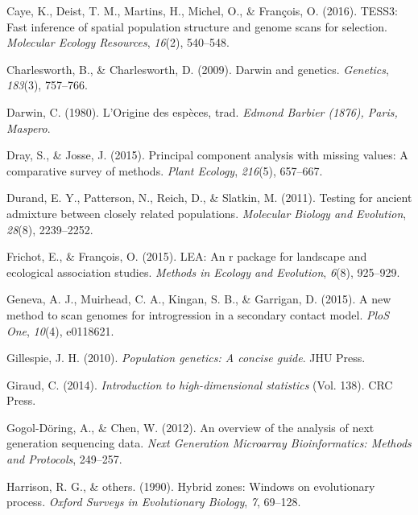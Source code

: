 \documentclass[12pt,twoside]{ugathesis}
\begin{document}
  \hypertarget{ref-caye2016tess3}{}
  Caye, K., Deist, T. M., Martins, H., Michel, O., \& François, O. (2016).
  TESS3: Fast inference of spatial population structure and genome scans
  for selection. \emph{Molecular Ecology Resources}, \emph{16}(2),
  540--548.
  
  \hypertarget{ref-charlesworth2009darwin}{}
  Charlesworth, B., \& Charlesworth, D. (2009). Darwin and genetics.
  \emph{Genetics}, \emph{183}(3), 757--766.
  
  \hypertarget{ref-darwin1980origine}{}
  Darwin, C. (1980). L'Origine des espèces, trad. \emph{Edmond Barbier
  (1876), Paris, Maspero}.
  
  \hypertarget{ref-dray2015principal}{}
  Dray, S., \& Josse, J. (2015). Principal component analysis with missing
  values: A comparative survey of methods. \emph{Plant Ecology},
  \emph{216}(5), 657--667.
  
  \hypertarget{ref-durand2011testing}{}
  Durand, E. Y., Patterson, N., Reich, D., \& Slatkin, M. (2011). Testing
  for ancient admixture between closely related populations.
  \emph{Molecular Biology and Evolution}, \emph{28}(8), 2239--2252.
  
  \hypertarget{ref-frichot2015lea}{}
  Frichot, E., \& François, O. (2015). LEA: An r package for landscape and
  ecological association studies. \emph{Methods in Ecology and Evolution},
  \emph{6}(8), 925--929.
  
  \hypertarget{ref-geneva2015new}{}
  Geneva, A. J., Muirhead, C. A., Kingan, S. B., \& Garrigan, D. (2015). A
  new method to scan genomes for introgression in a secondary contact
  model. \emph{PloS One}, \emph{10}(4), e0118621.
  
  \hypertarget{ref-gillespie2010population}{}
  Gillespie, J. H. (2010). \emph{Population genetics: A concise guide}.
  JHU Press.
  
  \hypertarget{ref-giraud2014introduction}{}
  Giraud, C. (2014). \emph{Introduction to high-dimensional statistics}
  (Vol. 138). CRC Press.
  
  \hypertarget{ref-gogol2012overview}{}
  Gogol-Döring, A., \& Chen, W. (2012). An overview of the analysis of
  next generation sequencing data. \emph{Next Generation Microarray
  Bioinformatics: Methods and Protocols}, 249--257.
  
  \hypertarget{ref-harrison1990hybrid}{}
  Harrison, R. G., \& others. (1990). Hybrid zones: Windows on
  evolutionary process. \emph{Oxford Surveys in Evolutionary Biology},
  \emph{7}, 69--128.
  
\end{document}

